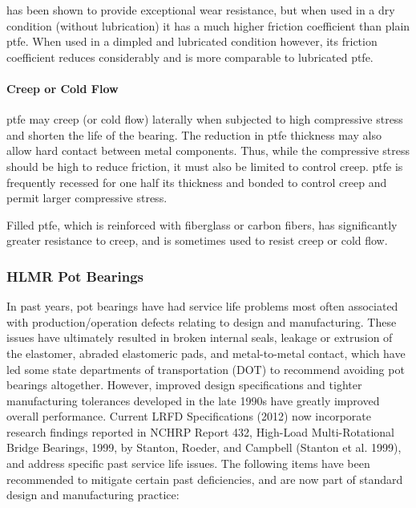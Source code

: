 \msm has been shown to provide exceptional wear resistance, but when used in a dry condition (without
lubrication) it has a much higher friction coefficient than plain \acrshort{ptfe}. When used in a dimpled and lubricated
condition however, its friction coefficient reduces considerably and is more comparable to lubricated \acrshort{ptfe}.

\paragraph{Creep or Cold Flow}
\acrshort{ptfe} may creep (or cold flow) laterally when subjected to high compressive stress and shorten the life of the
bearing. The reduction in \acrshort{ptfe} thickness may also allow hard contact between metal components. Thus, while the
compressive stress should be high to reduce friction, it must also be limited to control creep. \acrshort{ptfe} is frequently
recessed for one half its thickness and bonded to control creep and permit larger compressive stress.

Filled \acrshort{ptfe}, which is reinforced with fiberglass or carbon fibers, has significantly greater resistance to creep,
and is sometimes used to resist creep or cold flow.

\subsubsection{HLMR Pot Bearings}

In past years, pot bearings have had service life problems most often associated with production/operation
defects relating to design and manufacturing. These issues have ultimately resulted in broken internal seals, leakage
or extrusion of the elastomer, abraded elastomeric pads, and metal-to-metal contact, which have led some state
departments of transportation (DOT) to recommend avoiding pot bearings altogether. However, improved design
specifications and tighter manufacturing tolerances developed in the late 1990s have greatly improved overall
performance. Current LRFD Specifications (2012) now incorporate research findings reported in NCHRP Report 432,
High-Load Multi-Rotational Bridge Bearings, 1999, by Stanton, Roeder, and Campbell (Stanton et al. 1999), and
address specific past service life issues. The following items have been recommended to mitigate certain past
deficiencies, and are now part of standard design and manufacturing practice:

